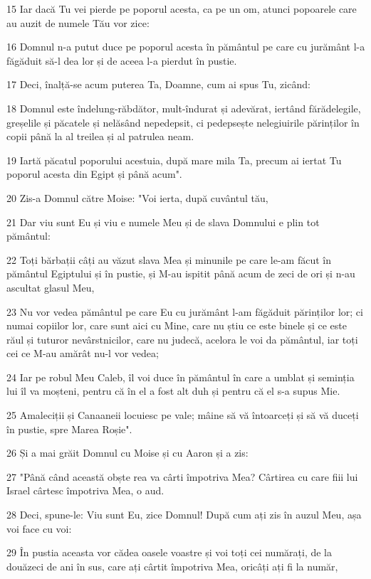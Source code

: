 \par 15 Iar dacă Tu vei pierde pe poporul acesta, ca pe un om, atunci popoarele care au auzit de numele Tău vor zice:
\par 16 Domnul n-a putut duce pe poporul acesta în pământul pe care cu jurământ l-a făgăduit să-l dea lor și de aceea l-a pierdut în pustie.
\par 17 Deci, înalță-se acum puterea Ta, Doamne, cum ai spus Tu, zicând:
\par 18 Domnul este îndelung-răbdător, mult-îndurat și adevărat, iertând fărădelegile, greșelile și păcatele și nelăsând nepedepsit, ci pedepsește nelegiuirile părinților în copii până la al treilea și al patrulea neam.
\par 19 Iartă păcatul poporului acestuia, după mare mila Ta, precum ai iertat Tu poporul acesta din Egipt și până acum".
\par 20 Zis-a Domnul către Moise: "Voi ierta, după cuvântul tău,
\par 21 Dar viu sunt Eu și viu e numele Meu și de slava Domnului e plin tot pământul:
\par 22 Toți bărbații câți au văzut slava Mea și minunile pe care le-am făcut în pământul Egiptului și în pustie, și M-au ispitit până acum de zeci de ori și n-au ascultat glasul Meu,
\par 23 Nu vor vedea pământul pe care Eu cu jurământ l-am făgăduit părinților lor; ci numai copiilor lor, care sunt aici cu Mine, care nu știu ce este binele și ce este răul și tuturor nevârstnicilor, care nu judecă, acelora le voi da pământul, iar toți cei ce M-au amărât nu-l vor vedea;
\par 24 Iar pe robul Meu Caleb, îl voi duce în pământul în care a umblat și seminția lui îl va moșteni, pentru că în el a fost alt duh și pentru că el s-a supus Mie.
\par 25 Amaleciții și Canaaneii locuiesc pe vale; mâine să vă întoarceți și să vă duceți în pustie, spre Marea Roșie".
\par 26 Și a mai grăit Domnul cu Moise și cu Aaron și a zis:
\par 27 "Până când această obște rea va cârti împotriva Mea? Cârtirea cu care fiii lui Israel cârtesc împotriva Mea, o aud.
\par 28 Deci, spune-le: Viu sunt Eu, zice Domnul! După cum ați zis în auzul Meu, așa voi face cu voi:
\par 29 În pustia aceasta vor cădea oasele voastre și voi toți cei numărați, de la douăzeci de ani în sus, care ați cârtit împotriva Mea, oricâți ați fi la număr,
